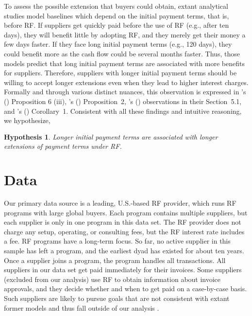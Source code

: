 \documentclass[A4,11pt]{article}
\newcommand{\cites}[1]{\citeauthor{#1}'s (\citeyear{#1})}
\renewcommand{\~}[1]{\tilde{#1}}
\renewcommand{\-}[1]{\overline{#1}}
\newtheorem{hypothesis}{Hypothesis}
\begin{document}
To assess the possible extension that buyers could obtain, extant analytical studies model baselines which depend on the initial payment terms, that is, before RF. If suppliers get quickly paid before the use of RF (e.g., after ten days), they will benefit little by adopting RF, and they merely get their money a few days faster. If they face long initial payment terms (e.g., 120 days), they could benefit more as the cash flow could be several months faster. Thus, those models predict that long initial payment terms are associated with more benefits for suppliers. Therefore, suppliers with longer initial payment terms should be willing to accept longer extensions even when they lead to higher interest charges. Formally and through various distinct nuances, this observation is expressed in \cites{Kouvelis2020} Proposition 6 (iii), \cites{Tanrisever2012} Proposition~2, \cites{vanderVliet2015} observations in their Section~5.1, and \cites{Wuttke2016} Corollary~1. Consistent with all these findings and intuitive reasoning, we hypothesize,

\begin{hypothesis}\label{H:d0}
Longer initial payment terms are associated with longer extensions of payment terms under RF. 
\end{hypothesis}

\section{Data}\label{sec:data}
Our primary data source is a leading, U.S.-based RF provider, which runs RF programs with large global buyers. Each program contains multiple suppliers, but each supplier is only in one program in this data set. The RF provider does not charge any setup, operating, or consulting fees, but the RF interest rate includes a fee. RF programs have a long-term focus. So far, no active supplier in this sample has left a program, and the earliest dyad has existed for about ten years. Once a supplier joins a program, the program handles all transactions. All suppliers in our data set get paid immediately for their invoices. Some suppliers (excluded from our analysis) use RF to obtain information about invoice approvals, and they decide whether and when to get paid on a case-by-case basis. Such suppliers are likely to pursue goals that are not consistent with extant former models and thus fall outside of our analysis \citep{Grueter2017, Hu2018}.
\end{document}
